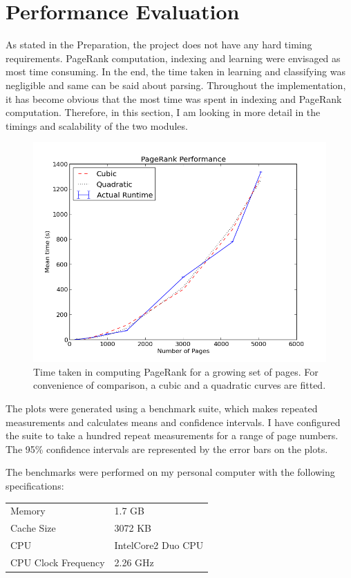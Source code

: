 \documentclass[12pt,notitlepage,twoside]{scrreprt}
\begin{document}
\section{Performance Evaluation}
As stated in the Preparation, the project does not have any hard timing requirements.
PageRank computation, indexing and learning were envisaged as most time consuming. In the
end, the time taken in learning and classifying was negligible and same can be said about
parsing.
Throughout the implementation, it has become obvious that the most time was spent in
indexing and PageRank computation. Therefore, in this section, I am looking in more detail
in the timings and scalability of the two modules.
\begin{figure}[h!]
  \centering
    \includegraphics[width=\linewidth]{figs/pr.png}
    \caption{Time taken in computing PageRank for a growing set of pages. For convenience
	    of comparison, a cubic and a quadratic curves are fitted.\label{pr}}
\end{figure}

The plots were generated using a benchmark suite, which makes repeated measurements and
calculates means and confidence intervals. I have configured the suite to take a hundred
repeat measurements for a range of page numbers. The 95\% confidence intervals are represented by
the error bars on the plots.

The benchmarks were performed on my personal computer with the following specifications:

\begin{tabular}[h!]{l l}
Memory & 1.7 GB \\
Cache Size & 3072 KB \\
CPU & IntelCore2 Duo CPU \\
CPU Clock Frequency & 2.26 GHz \\
\end{tabular}
\end{document}
